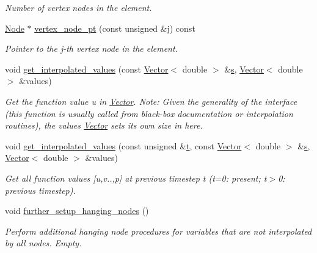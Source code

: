 \begin{DoxyCompactItemize}
\begin{DoxyCompactList}\small\item\em Number of vertex nodes in the element. \end{DoxyCompactList}\item 
\hyperlink{classoomph_1_1Node}{Node} $\ast$ \hyperlink{classoomph_1_1RefineableQCrouzeixRaviartElement_a0065d45089ddd4c632da34e1eb9e2b63}{vertex\+\_\+node\+\_\+pt} (const unsigned \&j) const
\begin{DoxyCompactList}\small\item\em Pointer to the j-\/th vertex node in the element. \end{DoxyCompactList}\item 
void \hyperlink{classoomph_1_1RefineableQCrouzeixRaviartElement_a5ca5707e906ec500f23e26fa0bdc44bc}{get\+\_\+interpolated\+\_\+values} (const \hyperlink{classoomph_1_1Vector}{Vector}$<$ double $>$ \&\hyperlink{cfortran_8h_ab7123126e4885ef647dd9c6e3807a21c}{s}, \hyperlink{classoomph_1_1Vector}{Vector}$<$ double $>$ \&values)
\begin{DoxyCompactList}\small\item\em Get the function value u in \hyperlink{classoomph_1_1Vector}{Vector}. Note\+: Given the generality of the interface (this function is usually called from black-\/box documentation or interpolation routines), the values \hyperlink{classoomph_1_1Vector}{Vector} sets its own size in here. \end{DoxyCompactList}\item 
void \hyperlink{classoomph_1_1RefineableQCrouzeixRaviartElement_a077a2ea57fd4fbbe0cc195fd30ec889f}{get\+\_\+interpolated\+\_\+values} (const unsigned \&\hyperlink{cfortran_8h_af6f0bd3dc13317f895c91323c25c2b8f}{t}, const \hyperlink{classoomph_1_1Vector}{Vector}$<$ double $>$ \&\hyperlink{cfortran_8h_ab7123126e4885ef647dd9c6e3807a21c}{s}, \hyperlink{classoomph_1_1Vector}{Vector}$<$ double $>$ \&values)
\begin{DoxyCompactList}\small\item\em Get all function values \mbox{[}u,v..,p\mbox{]} at previous timestep t (t=0\+: present; t$>$0\+: previous timestep). \end{DoxyCompactList}\item 
void \hyperlink{classoomph_1_1RefineableQCrouzeixRaviartElement_a9e248e7b6cf379a2602d8b0e1a7f5431}{further\+\_\+setup\+\_\+hanging\+\_\+nodes} ()
\begin{DoxyCompactList}\small\item\em Perform additional hanging node procedures for variables that are not interpolated by all nodes. Empty. \end{DoxyCompactList}\item 

\end{DoxyCompactItemize}
